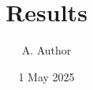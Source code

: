 \documentclass{beamer}
\title{Results}
\author{A. Author}
\institute{Some University}
\date{1 May 2025}
\begin{document}
\begin{frame}
\end{frame}
\begin{frame}
\end{frame}
\end{document}
